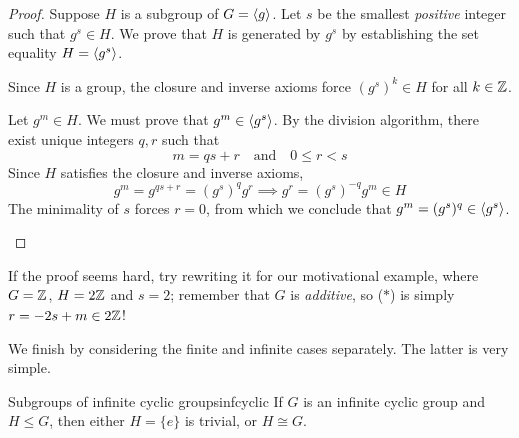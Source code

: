 \begin{proof}
	Suppose $H$ is a subgroup of $G=\left\langle g\right\rangle$. Let $s$ be the smallest \emph{positive} integer\footnotemark{} such that $g^s\in H$.
	We prove that $H$ is generated by $g^s$ by establishing the set equality $H=\left\langle g^s\right\rangle$.
	\begin{description}\itemsep0pt
		\item[$(\supseteq)$] Since $H$ is a group, the closure and inverse axioms force $(g^s)^k\in H$ for all $k\in\mathbb{Z}$.
		\item[$(\subseteq)$] Let $g^m\in H$. We must prove that $g^m\in\left\langle g^s\right\rangle$. By the division algorithm, there exist unique integers $q,r$ such that
		\[
			m=qs+r\quad\text{and}\quad 0\le r<s
		\]
		Since $H$ satisfies the closure and inverse axioms,
		\[
			g^m=g^{qs+r}=(g^s)^qg^r\implies g^r=(g^s)^{-q}g^m\in H \tag{$\ast$}
		\]
		The minimality of $s$ forces $r=0$, from which we conclude that $g^m=(g^s)^q\in\left\langle g^s\right\rangle$.\qedhere 
	\end{description}
\end{proof}



If the proof seems hard, try rewriting it for our motivational example, where $G=\mathbb{Z}$, $H=2\mathbb{Z}$ and $s=2$; remember that $G$ is \emph{additive}, so ($\ast$) is simply $r=-2s+m\in 2\mathbb{Z}$!

\medskip

We finish by considering the finite and infinite cases separately. The latter is very simple.

\begin{cor}{Subgroups of infinite cyclic groups}{infcyclic}
	If $G$ is an infinite cyclic group and $H\le G$, then either $H=\{e\}$ is trivial, or $H\cong G$.
\end{cor}

